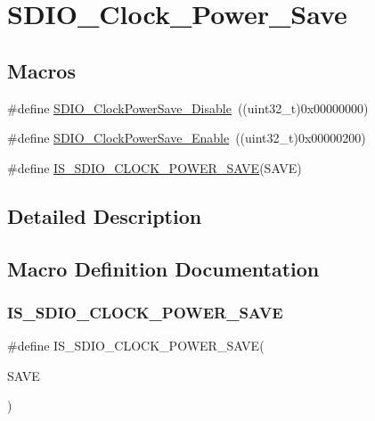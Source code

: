 \hypertarget{group___s_d_i_o___clock___power___save}{}\section{S\+D\+I\+O\+\_\+\+Clock\+\_\+\+Power\+\_\+\+Save}
\label{group___s_d_i_o___clock___power___save}
\subsection*{Macros}
\begin{DoxyCompactItemize}
\item 
\#define \mbox{\hyperlink{group___s_d_i_o___clock___power___save_ga032aa5fb2dfd7ba5dbd60a3845c82ba0}{S\+D\+I\+O\+\_\+\+Clock\+Power\+Save\+\_\+\+Disable}}~((uint32\+\_\+t)0x00000000)
\item 
\#define \mbox{\hyperlink{group___s_d_i_o___clock___power___save_ga9f5b66a0044c4ff36a3eb1ec758f7ea7}{S\+D\+I\+O\+\_\+\+Clock\+Power\+Save\+\_\+\+Enable}}~((uint32\+\_\+t)0x00000200)
\item 
\#define \mbox{\hyperlink{group___s_d_i_o___clock___power___save_ga41988203e5d4e35a755aa604f1876cd3}{I\+S\+\_\+\+S\+D\+I\+O\+\_\+\+C\+L\+O\+C\+K\+\_\+\+P\+O\+W\+E\+R\+\_\+\+S\+A\+VE}}(S\+A\+VE)
\end{DoxyCompactItemize}


\subsection{Detailed Description}


\subsection{Macro Definition Documentation}
\mbox{\label{group___s_d_i_o___clock___power___save_ga41988203e5d4e35a755aa604f1876cd3}} 
\subsubsection{\texorpdfstring{IS\_SDIO\_CLOCK\_POWER\_SAVE}{IS\_SDIO\_CLOCK\_POWER\_SAVE}}
{\footnotesize\ttfamily \#define I\+S\+\_\+\+S\+D\+I\+O\+\_\+\+C\+L\+O\+C\+K\+\_\+\+P\+O\+W\+E\+R\+\_\+\+S\+A\+VE(\begin{DoxyParamCaption}\item[{}]{S\+A\+VE }\end{DoxyParamCaption})}

